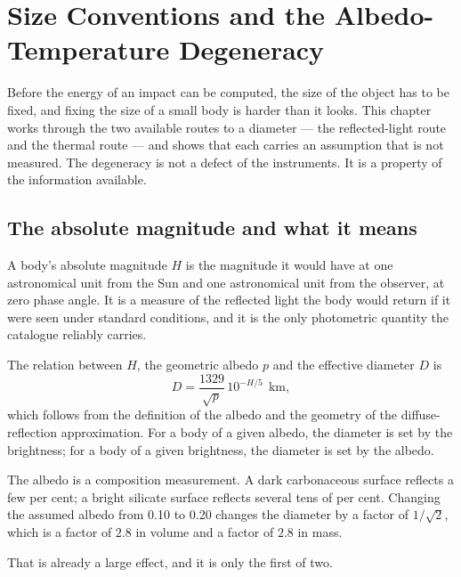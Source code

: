 
\chapter{Size Conventions and the Albedo-Temperature Degeneracy}
\label{ch:size-conventions}

Before the energy of an impact can be computed, the size of the object has to
be fixed, and fixing the size of a small body is harder than it looks. This
chapter works through the two available routes to a diameter --- the
reflected-light route and the thermal route --- and shows that each carries an
assumption that is not measured. The degeneracy is not a defect of the
instruments. It is a property of the information available.

\section{The absolute magnitude and what it means}

A body's absolute magnitude \(H\) is the magnitude it would have at one
astronomical unit from the Sun and one astronomical unit from the observer,
at zero phase angle. It is a measure of the reflected light the body would
return if it were seen under standard conditions, and it is the only
photometric quantity the catalogue reliably carries.

The relation between \(H\), the geometric albedo \(p\) and the effective
diameter \(D\) is
\begin{equation}
D = \frac{1329}{\sqrt{p}}\,10^{-H/5}\ \ \mathrm{km},
\label{eq:hdp2}
\end{equation}
which follows from the definition of the albedo and the geometry of the
diffuse-reflection approximation. For a body of a given albedo, the diameter
is set by the brightness; for a body of a given brightness, the diameter is
set by the albedo.

The albedo is a composition measurement. A dark carbonaceous surface reflects
a few per cent; a bright silicate surface reflects several tens of per cent.
Changing the assumed albedo from 0.10 to 0.20 changes the diameter by a
factor of \(1/\sqrt{2}\), which is a factor of \(2.8\) in volume and a factor
of \(2.8\) in mass.

That is already a large effect, and it is only the first of two.

